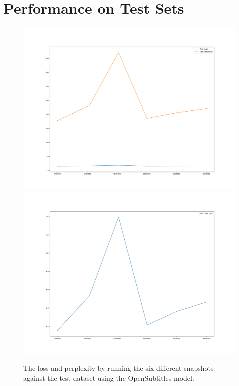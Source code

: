 \section{Performance on Test Sets}

\begin{figure}[H]
	\includegraphics[width=\linewidth]{img/plots/opensubtitles_not_reversed/test_metrics_both.png}
	\centering
	\small
	\endminipage\hfill
	\includegraphics[width=\linewidth]{img/plots/opensubtitles_not_reversed/test_metrics_loss.png}
	\centering
	\small
	\endminipage\hfill
	\caption{The loss and perplexity by running the six different snapshots against the test dataset using the OpenSubtitles model.}
	\label{result:test_performance:opensubtitles}
\end{figure}

